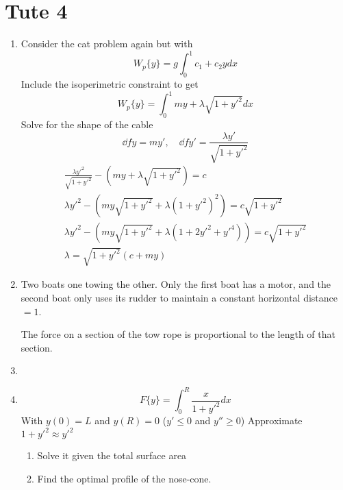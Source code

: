 \documentclass{E:/Documents/Latex/myassignment}
\begin{document}
\section{Tute 4}
\begin{enumerate}
	\item Consider the cat problem again but with
	\[W_p\{y\} = g\int_0^1 c_1 + c_2 y dx\]
	Include the isoperimetric constraint to get
	\[W_p\{y\} = \int_0^1 my + \lambda \sqrt{1+y'^2}dx\]
	Solve for the shape of the cable
	\[\dd fy = my', \quad \dd f{y'} = \frac{\lambda y'}{\sqrt{1+y'^2}}\]
	\begin{align*}
	\frac{\lambda y'^2}{\sqrt{1+y'^2}} - (my + \lambda \sqrt{1+y'^2}) = c\\
	\lambda y'^2 - (my\sqrt{1+y'^2} + \lambda (1+y'^2)^2) = c\sqrt{1+y'^2}\\
	\lambda y'^2 - (my\sqrt{1+y'^2} + \lambda (1+2y'^2 + y'^4)) = c\sqrt{1+y'^2}\\
	\lambda = \sqrt{1+y'^2} (c + my)
	\end{align*}




	\item Two boats one towing the other. Only the first boat has a motor, and the second boat only uses its rudder to maintain a constant horizontal distance $=1$.

	The force on a section of the tow rope is proportional to the length of that section. 
	\[\]

	\item
	\item 
	\[F\{y\} = \int_0^R \frac{x}{1+y'^2} dx\]
	With $y(0) = L$ and $y(R) = 0$ ($y' \leq 0$ and $y'' \geq 0$)
	Approximate $1+y'^2 \approx y'^2$
	\begin{enumerate}
		\item Solve it given the total surface area
		\item Find the optimal profile of the nose-cone.
		
	\end{enumerate}
\end{enumerate}
\end{document}
